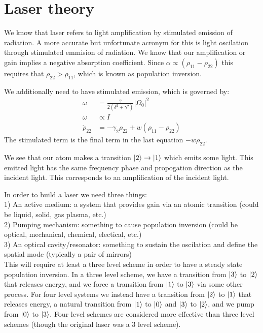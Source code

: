 \section{Laser theory}
We know that laser refers to light amplification by stimulated emission of radiation. A more accurate but unfortunate acronym for this is light oscilation through stimulated emmision of radiation.
We know that our amplification or gain implies a negative absorption coefficient. Since $\alpha \propto (\rho_{11} - \rho_{22})$ this requires that $\rho_{22} > \rho_{11}$, which is known as population inversion.

We additionally need to have stimulated emission, which is governed by:
\begin{align*}
	\omega &= \frac{\gamma}{2(\delta^2 +\gamma^2)} |\Omega_0|^2 \\
	\omega &\propto I \\
	\dot{\rho}_{22} &= -\gamma_2 \rho_{22} + w(\rho_{11} - \rho_{22})
\end{align*}
The stimulated term is the final term in the last equation $-w\rho_{22}$.

We see that our atom makes a transition $\ket{2}\to\ket{1}$ which emits some light. This emitted light has the same frequency phase and propogation direction as the incident light.
This corresponds to an amplification of the incident light.

In order to build a laser we need three things:\\
1) An active medium: a system that provides gain via an atomic transition (could be liquid, solid, gas plasma, etc.) \\
2) Pumping mechanism: something to cause population inversion (could be optical, mechanical, chemical, electical, etc.) \\
3) An optical cavity/resonator: something to sustain the oscilation and define the spatial mode (typically a pair of mirrors) \\

This will require at least a three level scheme in order to have a steady state population inversion.
In a three level scheme, we have a transition from $\ket{3}$ to $\ket{2}$ that releases energy, and we force a transition from $\ket{1}$ to $\ket{3}$ via some other process.
For four level systems we instead have a transition from $\ket{2}$ to $\ket{1}$ that releases energy, a natural transition from $\ket{1}$ to $\ket{0}$ and $\ket{3}$ to $\ket{2}$, and we pump from $\ket{0}$ to $\ket{3}$.
Four level schemes are considered more effective than three level schemes (though the original laser was a 3 level scheme).

